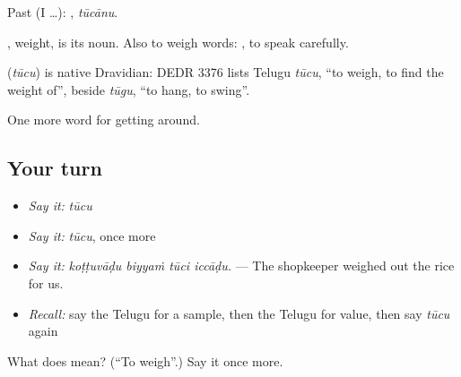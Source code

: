 Past (I …): , \emph{tūcānu}.

, weight, is its noun. Also to weigh words:   , to speak carefully.

\begin{cousinweb}
\textbf{} (\emph{tūcu}) is native Dravidian: DEDR 3376 lists Telugu \emph{tūcu}, \textquotedblleft{}to weigh, to find the weight of\textquotedblright{}, beside \emph{tūgu}, \textquotedblleft{}to hang, to swing\textquotedblright{}.
\end{cousinweb}

\begin{grammarlens}[title={What you've built}]
One more word for getting around.
\end{grammarlens}

\subsection*{Your turn}
\begin{itemize}
\raggedright
  \item \emph{Say it:} \emph{tūcu}
  \item \emph{Say it:} \emph{tūcu}, once more
  \item \emph{Say it:} \emph{koṭṭuvāḍu biyyaṁ tūci iccāḍu.} — The shopkeeper weighed out the rice for us.
  \item \emph{Recall:} say the Telugu for a sample, then the Telugu for value, then say \emph{tūcu} again
\end{itemize}

\begin{tcolorbox}[breakable,colback=teal!4,colframe=teal!35!black,title={Before you move on}]
What does  mean? (\textquotedblleft{}To weigh\textquotedblright{}.) Say it once more.
\end{tcolorbox}
